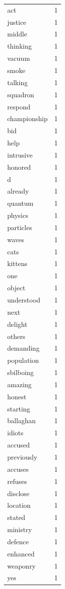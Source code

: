\begin{tabular}{lr}
act & 1 \\
justice & 1 \\
middle & 1 \\
thinking & 1 \\
vacuum & 1 \\
smoke & 1 \\
talking & 1 \\
squadron & 1 \\
respond & 1 \\
championship & 1 \\
bid & 1 \\
help & 1 \\
intrusive & 1 \\
honored & 1 \\
d & 1 \\
already & 1 \\
quantum & 1 \\
physics & 1 \\
particles & 1 \\
waves & 1 \\
cats & 1 \\
kittens & 1 \\
one & 1 \\
object & 1 \\
understood & 1 \\
next & 1 \\
delight & 1 \\
others & 1 \\
demanding & 1 \\
population & 1 \\
sbilboing & 1 \\
amazing & 1 \\
honest & 1 \\
starting & 1 \\
ballaghan & 1 \\
idiots & 1 \\
accused & 1 \\
previously & 1 \\
accuses & 1 \\
refuses & 1 \\
disclose & 1 \\
location & 1 \\
stated & 1 \\
ministry & 1 \\
defence & 1 \\
enhanced & 1 \\
weaponry & 1 \\
yes & 1 \\

\end{tabular}
